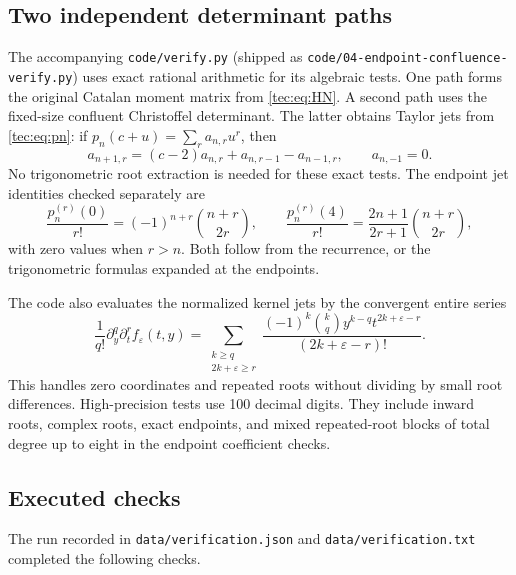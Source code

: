 \documentclass[11pt,a4paper]{article}
\numberwithin{equation}{section}
\theoremstyle{definition}
\theoremstyle{remark}
\begin{document}
\subsection{Two independent determinant paths}
The accompanying \texttt{code/verify.py} (shipped as
\nolinkurl{code/04-endpoint-confluence-verify.py}) uses exact rational arithmetic for
its algebraic tests. One path forms the original Catalan moment matrix
from \eqref{tec:eq:HN}. A second path uses the fixed-size confluent
Christoffel determinant. The latter obtains Taylor jets from
\eqref{tec:eq:pn}: if $p_n(c+u)=\sum_r a_{n,r}u^r$, then
\[
 a_{n+1,r}=(c-2)a_{n,r}+a_{n,r-1}-a_{n-1,r},
 \qquad a_{n,-1}=0.
\]
No trigonometric root extraction is needed for these exact tests.
The endpoint jet identities checked separately are
\begin{equation}\label{tec:eq:endpointjets}
 \frac{p_n^{(r)}(0)}{r!}=(-1)^{n+r}\binom{n+r}{2r},\qquad
 \frac{p_n^{(r)}(4)}{r!}
   =\frac{2n+1}{2r+1}\binom{n+r}{2r},
\end{equation}
with zero values when $r>n$. Both follow from the recurrence, or the
trigonometric formulas expanded at the endpoints.

The code also evaluates the normalized kernel jets by the convergent
entire series
\begin{equation}\label{tec:eq:jetseries}
 \frac1{q!}\partial_y^q\partial_t^r f_\varepsilon(t,y)
 =\sum_{\substack{k\ge q\\2k+\varepsilon\ge r}}
 \frac{(-1)^k\binom{k}{q}y^{k-q}t^{2k+\varepsilon-r}}
 {(2k+\varepsilon-r)!}.
\end{equation}
This handles zero coordinates and repeated roots without dividing by
small root differences. High-precision tests use 100 decimal digits.
They include inward roots, complex roots, exact endpoints, and mixed
repeated-root blocks of total degree up to eight in the endpoint
coefficient checks.

\subsection{Executed checks}
The run recorded in \texttt{data/verification.json} and
\texttt{data/verification.txt} completed the following checks.
\end{document}
